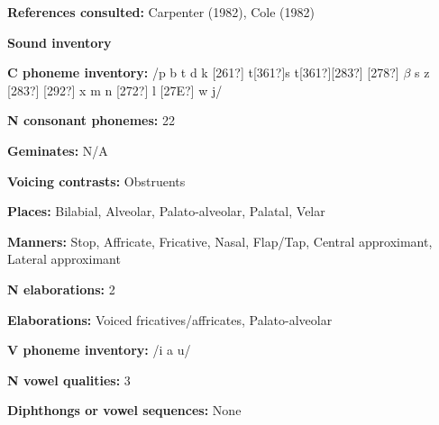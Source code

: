 \begin{styleBody}
\textbf{References consulted: }Carpenter (1982), Cole (1982)
\end{styleBody}

\begin{styleBody}
\textbf{Sound inventory}
\end{styleBody}

\begin{styleBody}
\textbf{C phoneme inventory:} /p b t d k [261?] t[361?]s t[361?][283?] [278?] $\beta $ s z [283?] [292?] x m n [272?] l [27E?] w j/
\end{styleBody}

\begin{styleBody}
\textbf{N consonant phonemes:} 22
\end{styleBody}

\begin{styleBody}
\textbf{Geminates:} N/A
\end{styleBody}

\begin{styleBody}
\textbf{Voicing contrasts:} Obstruents
\end{styleBody}

\begin{styleBody}
\textbf{Places:} Bilabial, Alveolar, Palato-alveolar, Palatal, Velar
\end{styleBody}

\begin{styleBody}
\textbf{Manners:} Stop, Affricate, Fricative, Nasal, Flap/Tap, Central approximant, Lateral approximant
\end{styleBody}

\begin{styleBody}
\textbf{N elaborations:} 2
\end{styleBody}

\begin{styleBody}
\textbf{Elaborations:} Voiced fricatives/affricates, Palato-alveolar
\end{styleBody}

\begin{styleBody}
\textbf{V phoneme inventory:} /i a u/
\end{styleBody}

\begin{styleBody}
\textbf{N vowel qualities:} 3
\end{styleBody}

\begin{styleBody}
\textbf{Diphthongs or vowel sequences:} None
\end{styleBody}

